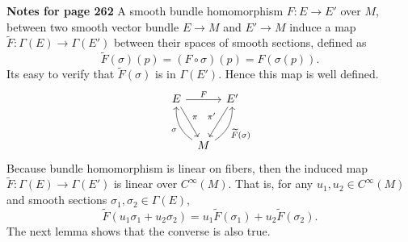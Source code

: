 \documentclass[a4paper]{article}
\theoremstyle{remark}
\newcommand{\CM}{C^{\infty}(M)} %
\begin{document}
\textbf{Notes for page 262} A smooth bundle homomorphism $F : E \to E'$ over $M$, between two smooth vector bundle $E \to M$ and $E' \to M$ induce a map $\widetilde{F} : \Gamma(E) \to \Gamma(E')$ between their spaces of smooth sections, defined as
$$
\widetilde{F}(\sigma)(p) = (F \circ \sigma)(p)= F(\sigma(p)).
$$ 
Its easy to verify that $\widetilde{F}(\sigma)$ is in $\Gamma(E')$. Hence this map is well defined. 
\[
\begin{tikzcd}[row sep=large,column sep=tiny]
E \ar[rr,"F"] \ar[dr,"\pi"] & & E' \ar[dl,swap,"\pi'"] \\
& M \ar[ul, bend left=30, "\sigma"] \ar[ur, bend right=30, swap, "\widetilde{F}(\sigma)"] & 
\end{tikzcd}
\]
Because bundle homomorphism is linear on fibers, then the induced map $\widetilde{F} : \Gamma(E) \to \Gamma(E')$ is linear over $\CM$. That is, for any $u_1,u_2 \in \CM$ and smooth sections $\sigma_1,\sigma_2 \in \Gamma(E)$,
$$
\widetilde{F}(u_1\sigma_1+ u_2 \sigma_2) = u_1 \widetilde{F}(\sigma_1) + u_2 \widetilde{F}(\sigma_2).
$$
The next lemma shows that the converse is also true.
\end{document}

